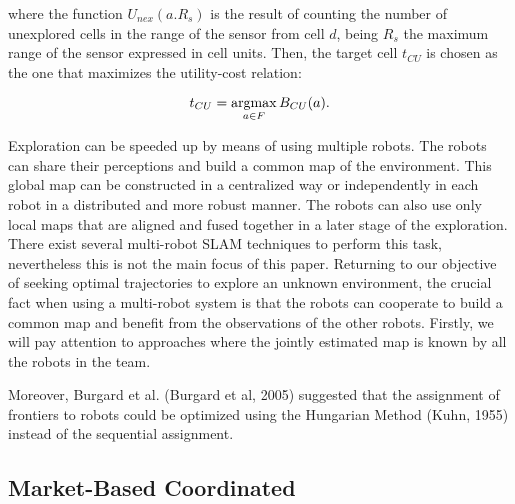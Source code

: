 where the function $U_{nex}(a. R_{s})$ is the result of counting the
number of unexplored cells in the range of the sensor from cell $d$, being $R_{s}$ the maximum range of the sensor expressed in cell units.
Then, the target cell $t_{CU}$ is chosen as the one that maximizes the utility-cost relation:

\begin{equation}
t_{CU} = \operatorname*{argmax}_{a \in F} B_{CU}(a).
\end{equation}

Exploration can be speeded up by means of using multiple
robots. The robots can share their perceptions and build a
common map of the environment. This global map can be
constructed in a centralized way or independently in each
robot in a distributed and more robust manner. The robots
can also use only local maps that are aligned and fused together in a later stage of the exploration. There exist several
multi-robot SLAM techniques to perform this task, nevertheless this is not the main focus of this paper. Returning to
our objective of seeking optimal trajectories to explore an
unknown environment, the crucial fact when using a multi-robot system is that the robots can cooperate to build a common map and benefit from the observations of the other robots. Firstly, we will pay attention to approaches where
the jointly estimated map is known by all the robots in the
team.

Moreover, Burgard et al. (Burgard et al,
2005) suggested that the assignment of frontiers to robots could be optimized
using the Hungarian Method (Kuhn, 1955) instead of the sequential assignment.
\subsection{Market-Based Coordinated}

